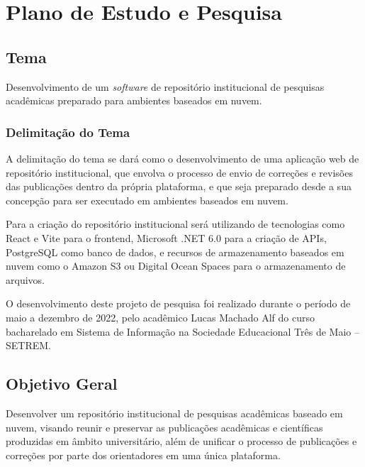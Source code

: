 \chapter{Plano de Estudo e Pesquisa} \label{chap:ResearchPlan}

\section{Tema} \label{sec::Theme}
Desenvolvimento de um \emph{software} de repositório institucional de
pesquisas acadêmicas preparado para ambientes baseados em nuvem.

\subsection{Delimitação do Tema} \label{subsec::ThemeDelimitation}

A delimitação do tema se dará como o desenvolvimento de uma aplicação
web de repositório institucional, que envolva o processo de envio
de correções e revisões das publicações dentro da própria plataforma,
e que seja preparado desde a sua concepção para ser executado em ambientes
baseados em nuvem.

Para a criação do repositório institucional será utilizando de tecnologias
como React e Vite para o frontend, Microsoft .NET 6.0 para a criação
de APIs, PostgreSQL como banco de dados, e recursos de armazenamento baseados em
nuvem como o Amazon S3 ou Digital Ocean Spaces para o armazenamento de arquivos.

O desenvolvimento deste projeto de pesquisa foi realizado durante o período de
maio a dezembro de 2022, pelo acadêmico Lucas Machado Alf do curso bacharelado
em Sistema de Informação na Sociedade Educacional Três de Maio – SETREM.

\section{Objetivo Geral} \label{sec:objective}

Desenvolver um repositório institucional de pesquisas acadêmicas
baseado em nuvem, visando reunir e preservar as publicações acadêmicas
e científicas produzidas em âmbito universitário, além de unificar o processo
de publicações e correções por parte dos orientadores em uma única plataforma.


